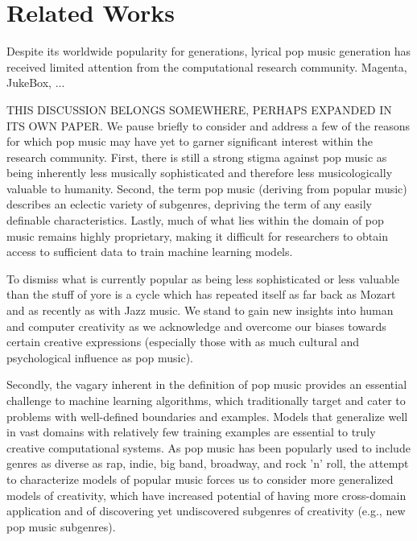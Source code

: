 \documentclass[letterpaper]{article}
\begin{document}
\section{Related Works}

Despite its worldwide popularity for generations, lyrical pop music generation has received limited attention from the computational research community. Magenta, JukeBox, ...

THIS DISCUSSION BELONGS SOMEWHERE, PERHAPS EXPANDED IN ITS OWN PAPER. We pause briefly to consider and address a few of the reasons for which pop music may have yet to garner significant interest within the research community. First, there is still a strong stigma against pop music as being inherently less musically sophisticated and therefore less musicologically valuable to humanity. Second, the term pop music (deriving from popular music) describes an eclectic variety of subgenres, depriving the term of any easily definable characteristics. Lastly, much of what lies within the domain of pop music remains highly proprietary, making it difficult for researchers to obtain access to sufficient data to train machine learning models.

To dismiss what is currently popular as being less sophisticated or less valuable than the stuff of yore is a cycle which has repeated itself as far back as Mozart and as recently as with Jazz music. We stand to gain new insights into human and computer creativity as we acknowledge and overcome our biases towards certain creative expressions (especially those with as much cultural and psychological influence as pop music).

Secondly, the vagary inherent in the definition of pop music provides an essential challenge to machine learning algorithms, which traditionally target and cater to problems with well-defined boundaries and examples. Models that generalize well in vast domains with relatively few training examples are essential to truly creative computational systems. As pop music has been popularly used to include genres as diverse as rap, indie, big band, broadway, and rock 'n' roll, the attempt to characterize models of popular music forces us to consider more generalized models of creativity, which have increased potential of having more cross-domain application and of discovering yet undiscovered subgenres of creativity (e.g., new pop music subgenres).
\end{document}
